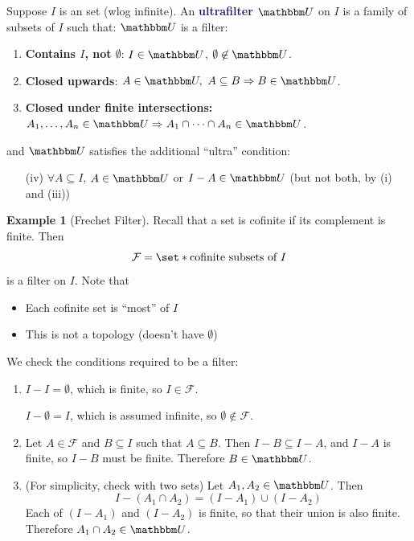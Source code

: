 \documentclass[11pt]{article}
\numberwithin{equation}{section}
\newcommand{\navy}[1]{\textcolor{MidnightBlue}{\bf #1}}
\newcounter{theo}[section]\setcounter{theo}{0}
\theoremstyle{definition}
\theoremstyle{definition}
\newtheorem{example}{\color{WildStrawberry}Example}[section]
\def\Set{\set*}%
\def\sse{\subseteq}
\def\imp{\Rightarrow}
\newcommand{\1}{\mathbbm 1}
\newcommand{\UU}{\mathbbm U}
\newcommand{\fF}{\mathcal F}
\begin{document}
\begin{definition}[Ultrafilter]
	Suppose $I$ is an set (wlog infinite). An \navy{ultrafilter $\UU$} on $I$ is a family of subsets of $I$ such that:
	$\UU$ is a filter:
	\begin{enumerate}
		\item \textbf{Contains $I$, not $\emptyset$}: $I \in \UU$, $\emptyset \not\in \UU$.
		\item \textbf{Closed upwards}: $A \in \UU, \ A \sse B \imp B \in \UU$.
		\item \textbf{Closed under finite intersections:} $A_1, \ldots, A_n \in \UU \imp A_1 \cap \cdots \cap A_n \in \UU$. 
	\end{enumerate}
	and $\UU$ satisfies the additional ``ultra'' condition:
	\begin{enumerate}
		\item[(iv)] $\forall A \sse I$, $A \in \UU$ or $I - A \in \UU$ (but not both, by (i) and (iii))
	\end{enumerate}
\end{definition}

\begin{example}[Frechet Filter]
	Recall that a set is cofinite if its complement is finite. 
	Then
	\begin{equation}
		\fF = \Set{\text{cofinite subsets of $I$}} 
	\end{equation}
	is a filter on $I$. Note that
	\begin{itemize}
		\item Each cofinite set is ``most'' of $I$
		\item This is not a topology (doesn't have $\emptyset$)
	\end{itemize}
	We check the conditions required to be a filter:
	\begin{enumerate}
		\item $I - I = \emptyset$, which is finite, so $I \in \fF$. 

		$I - \emptyset = I$, which is assumed infinite, so $\emptyset \not\in \fF$. 
		\item Let $A \in \fF$ and $B \sse I$ such that $A \sse B$. Then $I - B \sse I - A$, and $I - A$ is finite, so $I - B$ must be finite. Therefore $B \in \UU$. 
		\item (For simplicity, check with two sets) Let $A_1, A_2 \in \UU$. Then 
		\begin{equation}
		 	I - (A_1 \cap A_2) = (I - A_1) \cup (I - A_2)
		\end{equation} 
		Each of $(I - A_1)$ and $(I - A_2)$ is finite, so that their union is also finite. Therefore $A_1 \cap A_2 \in \UU$. 
	\end{enumerate}
\end{example}
\end{document}
